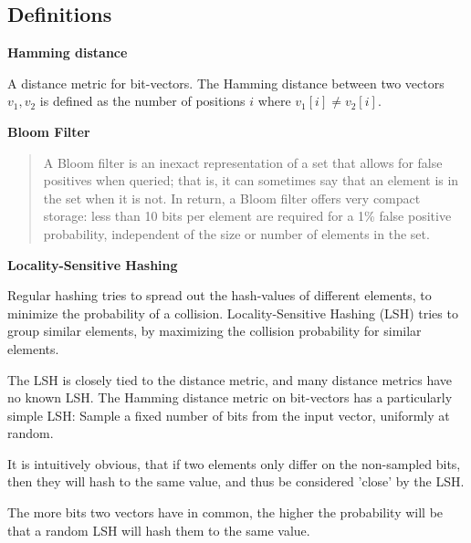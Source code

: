 \documentclass[a4paper,11pt]{article}
\begin{document}
\subsection{Definitions}
\begin{description}
\item \textbf{Hamming distance}

A distance metric for bit-vectors. The Hamming distance between two vectors $v_1, v_2$ is defined as the number of positions $i$ where $v_1[i] \neq v_2[i]$.

\item \textbf{Bloom Filter}

\begin{quotation}
A Bloom filter is an inexact representation of a set that allows for false positives when queried; that is, it can sometimes say that an element is in the set when it is not. In return, a Bloom filter offers very compact storage: less than 10 bits per element are required for a 1\% false positive probability, independent of the size or number of elements in the set.\cite{paper:bloom}
\end{quotation}


\item \textbf{Locality-Sensitive Hashing}

Regular hashing tries to spread out the hash-values of different elements, to minimize the probability of a collision. Locality-Sensitive Hashing (LSH) tries to group similar elements, by maximizing the collision probability for similar elements.

The LSH is closely tied to the distance metric, and many distance metrics have no known LSH. The Hamming distance metric on bit-vectors has a particularly simple LSH: Sample a fixed number of bits from the input vector, uniformly at random. 

It is intuitively obvious, that if two elements only differ on the non-sampled bits, then they will hash to the same value, and thus be considered 'close' by the LSH.

The more bits two vectors have in common, the higher the probability will be that a random LSH will hash them to the same value.


\end{description}
\end{document}
